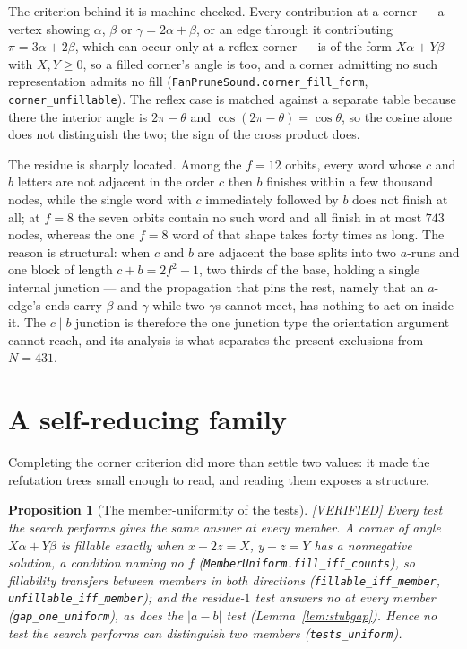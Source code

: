 \documentclass[11pt,reqno]{amsart}
\theoremstyle{plain}
\newtheorem{proposition}[theorem]{Proposition}
\theoremstyle{definition}
\newcommand{\lab}[1]{\hfill\textnormal{\footnotesize\textsc{[#1]}}}
\begin{document}
The criterion behind it is machine-checked. Every contribution at a corner --- a vertex showing
$\alpha$, $\beta$ or $\gamma=2\alpha+\beta$, or an edge through it contributing
$\pi=3\alpha+2\beta$, which can occur only at a reflex corner --- is of the form $X\alpha+Y\beta$
with $X,Y\ge0$, so a filled corner's angle is too, and a corner admitting no such representation
admits no fill (\texttt{FanPruneSound.corner\_fill\_form},
\texttt{corner\_unfillable}). The reflex case is matched against a separate table because there the
interior angle is $2\pi-\theta$ and $\cos(2\pi-\theta)=\cos\theta$, so the cosine alone does not
distinguish the two; the sign of the cross product does.

The residue is sharply located. Among the $f=12$ orbits, every word whose $c$ and $b$ letters are
not adjacent in the order $c$ then $b$ finishes within a few thousand nodes, while the single word
with $c$ immediately followed by $b$ does not finish at all; at $f=8$ the seven orbits contain no
such word and all finish in at most $743$ nodes, whereas the one $f=8$ word of that shape takes
forty times as long. The reason is structural: when $c$ and $b$ are adjacent the base splits into
two $a$-runs and one block of length $c+b=2f^{2}-1$, two thirds of the base, holding a single
internal junction --- and the propagation that pins the rest, namely that an $a$-edge's ends carry
$\beta$ and $\gamma$ while two $\gamma$s cannot meet, has nothing to act on inside it. The
$c\mid b$ junction is therefore the one junction type the orientation argument cannot reach, and
its analysis is what separates the present exclusions from $N=431$.

\section{A self-reducing family}\label{sec:march}

Completing the corner criterion did more than settle two values: it made the refutation trees small
enough to read, and reading them exposes a structure.

\begin{proposition}[The member-uniformity of the tests]\label{prop:testsuniform}\lab{VERIFIED}
Every test the search performs gives the same answer at every member. A corner of angle
$X\alpha+Y\beta$ is fillable exactly when $x+2z=X$, $y+z=Y$ has a nonnegative solution, a condition
naming no $f$ (\texttt{MemberUniform.fill\_iff\_counts}), so fillability transfers between members
in both directions (\texttt{fillable\_iff\_member}, \texttt{unfillable\_iff\_member}); and the
residue-$1$ test answers no at every member (\texttt{gap\_one\_uniform}), as does the
$|a-b|$ test (Lemma~\ref{lem:stubgap}). Hence no test the search performs can distinguish two
members (\texttt{tests\_uniform}).
\end{proposition}
\end{document}
